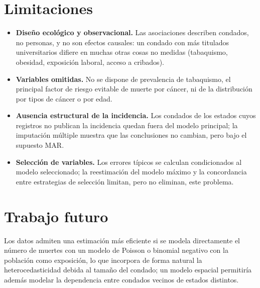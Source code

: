\section{Limitaciones}

\begin{itemize}
  \item \textbf{Diseño ecológico y observacional.} Las asociaciones describen condados, no
  personas, y no son efectos causales: un condado con más titulados universitarios difiere en
  muchas otras cosas no medidas (tabaquismo, obesidad, exposición laboral, acceso a cribados).
  \item \textbf{Variables omitidas.} No se dispone de prevalencia de tabaquismo, el principal factor
  de riesgo evitable de muerte por cáncer, ni de la distribución por tipos de cáncer o por edad.
  \item \textbf{Ausencia estructural de la incidencia.} Los condados de los estados cuyos registros
  no publican la incidencia quedan fuera del modelo principal; la imputación múltiple muestra que
  las conclusiones no cambian, pero bajo el supuesto MAR.
  \item \textbf{Selección de variables.} Los errores típicos se calculan condicionados al modelo
  seleccionado; la reestimación del modelo máximo y la concordancia entre estrategias de selección
  limitan, pero no eliminan, este problema.
\end{itemize}

\section{Trabajo futuro}

Los datos admiten una estimación más eficiente si se modela directamente el número de muertes con
un modelo de Poisson o binomial negativo con la población como exposición, lo que incorpora de forma
natural la heterocedasticidad debida al tamaño del condado; un modelo espacial permitiría además
modelar la dependencia entre condados vecinos de estados distintos.
